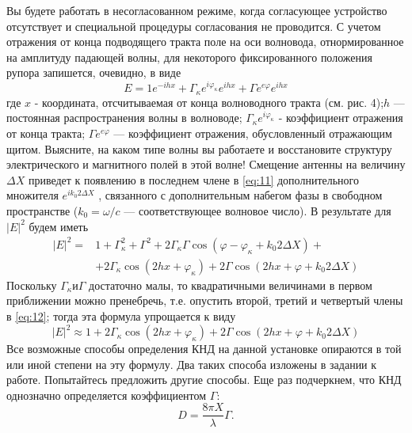 Вы будете работать в несогласованном режиме, когда согласующее устройство отсутствует и специальной процедуры 
согласования не проводится. С учетом отражения от конца подводящего тракта поле на оси волновода, отнормированное на 
амплитуду падающей волны, для некоторого фиксированного положения рупора запишется, очевидно, в виде
\begin{equation}
    E = 1e^{-ihx}+\Gamma_\kappa e^{i\varphi_\kappa} e^{ihx}+ \Gamma e^{e\varphi} e^{ihx}
    \label{eq:11}
\end{equation}
где $x$ - координата, отсчитываемая от конца волноводного тракта (см. рис. 4);$h$ — постоянная распространения волны в 
волноводе; $\Gamma_\kappa e^{i\varphi_\kappa}$ - коэффициент отражения от конца тракта; $\Gamma e^{e\varphi}$ — коэффициент 
отражения, обусловленный отражающим щитом. Выясните, на каком типе волны вы работаете и восстановите структуру 
электрического и магнитного полей в этой волне! Смещение антенны на величину $\Delta X$ приведет к появлению в последнем члене 
в \ref{eq:11} дополнительного множителя $ e^{ i k_0 2\Delta X } $ , связанного с дополнительным набегом фазы в свободном пространстве
($k_0=\omega/c$ — соответствующее волновое число). В результате для $ |E|^2 $ будем иметь
\begin{equation}
    \begin{aligned}
        |E|^{2} = &1+\Gamma_{\kappa}^{2}+\Gamma^{2}+2 \Gamma_{\kappa} \Gamma \cos {(\varphi-\varphi_{\kappa}+k_{0} 2 \Delta X)} +\\
        &+ 2 \Gamma_{\kappa} \cos{(2 h x+\varphi_{\kappa})}+2 \Gamma \cos{(2 h x+\varphi+k_{0} 2 \Delta X)}
    \end{aligned}
    \label{eq:12}
\end{equation}
Поскольку $ \Gamma_{\kappa} \text{и} \Gamma$ достаточно малы, то квадратичными величинами в первом приближении можно 
пренебречь, т.е. опустить второй, третий и четвертый члены в \ref{eq:12}; тогда эта формула упрощается к виду
\begin{equation}
    |E|^{2} \approx 1+2 \Gamma_{\kappa} \cos \left(2 h x+\varphi_{\kappa}\right)+2 \Gamma \cos \left(2 h x+\varphi+k_{0} 2 \Delta X\right)
    \label{eq:13}
\end{equation}
Все возможные способы определения КНД на данной установке опираются в той или иной степени на эту формулу. Два таких 
способа изложены в задании к работе. Попытайтесь предложить другие способы. Еще раз подчеркнем, что КНД однозначно 
определяется коэффициентом $\Gamma$:
\begin{equation}
    D = \frac{8 \pi X}{\lambda} \Gamma.
    \label{eq:14}
\end{equation}

